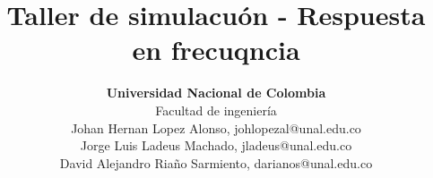 \documentclass[conference]{IEEEtran}
\begin{document}
    


\title{Taller de simulacuón - Respuesta en frecuqncia}
\author{\textbf{Universidad Nacional de Colombia}\vspace{0.5cm}\\Facultad de ingeniería\\
Johan Hernan Lopez Alonso, johlopezal@unal.edu.co\\
Jorge Luis Ladeus Machado, jladeus@unal.edu.co\\
David Alejandro Riaño Sarmiento, darianos@unal.edu.co
}

\maketitle
\end{document}
